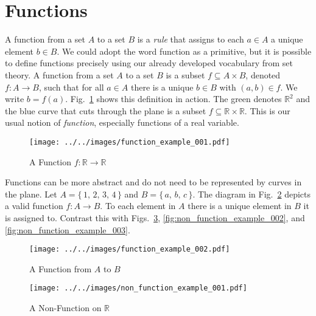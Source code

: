 \documentclass{article}
\theoremstyle{plain}
\theoremstyle{normal}
\newenvironment{definition}{%
    \pushQED{\qed}\renewcommand{\qedsymbol}{$\blacksquare$}\definitionx%
}{%
    \popQED\enddefinitionx%
}
\begin{document}
    \section{Functions}
        A function from a set $A$ to a set $B$ is a \textit{rule} that assigns
        to each $a\in{A}$ a unique element $b\in{B}$. We could adopt the word
        function as a primitive, but it is possible to define functions
        precisely using our already developed vocabulary from set theory.
        \begin{definition}[\textbf{Function}]
            A function from a set $A$ to a set $B$ is a subset
            $f\subseteq{A}\times{B}$, denoted $f:A\rightarrow{B}$, such that
            for all $a\in{A}$ there is a unique $b\in{B}$ with $(a,b)\in{f}$.
            We write $b=f(a)$.
        \end{definition}
        Fig.~\ref{fig:function_example_001} shows this definition in action.
        The green denotes $\mathbb{R}^{2}$ and the blue curve that cuts through
        the plane is a subset $f\subseteq\mathbb{R}\times\mathbb{R}$. This is
        our usual notion of \textit{function}, especially functions of a real
        variable.
        \begin{figure}
            \centering
            \texttt{[image: ../../images/function\_example\_001.pdf]}
            \caption{A Function $f:\mathbb{R}\rightarrow\mathbb{R}$}
            \label{fig:function_example_001}
        \end{figure}
        \par\hfill\par
        Functions can be more abstract and do not need to be represented by
        curves in the plane. Let $A=\{\,1,\,2,\,3,\,4\,\}$ and
        $B=\{\,a,\,b,\,c\,\}$. The diagram in
        Fig.~\ref{fig:function_example_002} depicts a valid function
        $f:A\rightarrow{B}$. To each element in $A$ there is a unique element
        in $B$ it is assigned to. Contrast this with
        Figs.~\ref{fig:non_function_example_001},
        \ref{fig:non_function_example_002}, and \ref{fig:non_function_example_003}.
        \begin{figure}
            \centering
            \texttt{[image: ../../images/function\_example\_002.pdf]}
            \caption{A Function from $A$ to $B$}
            \label{fig:function_example_002}
        \end{figure}
        \begin{figure}
            \centering
            \texttt{[image: ../../images/non\_function\_example\_001.pdf]}
            \caption{A Non-Function on $\mathbb{R}$}
            \label{fig:non_function_example_001}
        \end{figure}
\end{document}
